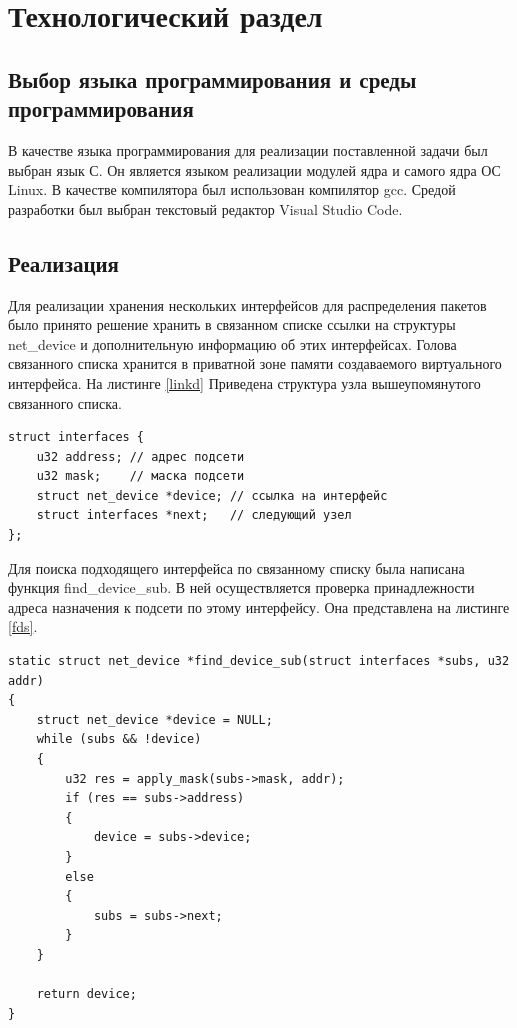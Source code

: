 \documentclass[14pt, a4paper]{extarticle}
\begin{document}
\clearpage
\section{Технологический раздел}
\subsection{Выбор языка программирования и среды программирования}
В качестве языка программирования для реализации поставленной
задачи был выбран язык С. Он является языком реализации модулей ядра и самого ядра ОС Linux. В качестве компилятора был использован
компилятор gcc. Средой разработки был выбран текстовый редактор Visual Studio Code.

\subsection{Реализация}
Для реализации хранения нескольких интерфейсов для распределения пакетов было принято решение хранить в связанном списке ссылки на структуры net\_device и дополнительную информацию об этих интерфейсах. Голова связанного списка хранится в приватной зоне памяти создаваемого виртуального интерфейса. На листинге \ref{linkd} Приведена структура узла вышеупомянутого связанного списка.

\begin{lstlisting}[caption=struct interfaces, label={linkd}]
struct interfaces {
    u32 address; // адрес подсети
    u32 mask;    // маска подсети
    struct net_device *device; // ссылка на интерфейс
    struct interfaces *next;   // следующий узел
};
\end{lstlisting}

Для поиска подходящего интерфейса по связанному списку была написана функция find\_device\_sub. В ней осуществляется проверка принадлежности адреса назначения к подсети по этому интерфейсу. Она представлена на листинге \ref{fds}.

\begin{lstlisting}[caption=find\_device\_sub, label=fds]
static struct net_device *find_device_sub(struct interfaces *subs, u32 addr)
{
    struct net_device *device = NULL;
    while (subs && !device)
    {
        u32 res = apply_mask(subs->mask, addr);
        if (res == subs->address)
        {
            device = subs->device;
        }
        else
        {
            subs = subs->next;
        }
    }

    return device;
}
\end{lstlisting}
\end{document}
